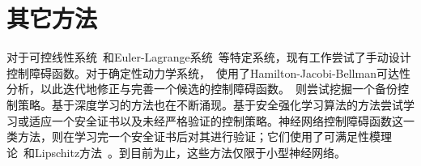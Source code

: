 \section{其它方法}
对于可控线性系统~\cite{clark2021automatica-controllablelinear}和Euler-Lagrange系统~\cite{cortez2020acc-eluerlag}等特定系统，现有工作尝试了手动设计控制障碍函数。对于确定性动力学系统，~\cite{tonkens2022iros-refining}使用了Hamilton-Jacobi-Bellman可达性分析，以此迭代地修正与完善一个候选的控制障碍函数。~\cite{chen21cdc-backup}则尝试挖掘一个备份控制策略。基于深度学习的方法也在不断涌现。基于安全强化学习算法的方法尝试学习\cite{ma2022l4dc-saferl}或适应\cite{chen2021lcss-saferl,westenbroek2021ifac-saferl}一个安全证书以及未经严格验证的控制策略。神经网络控制障碍函数这一类方法，则在学习完一个安全证书后对其进行验证；它们使用了可满足性模理论~\cite{zhao2021fac-provableneuralcbf}和Lipschitz方法~\cite{jin2020arxiv-provableneuralcbf}。到目前为止，这些方法仅限于小型神经网络。


